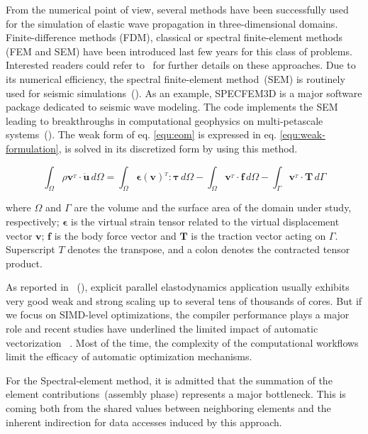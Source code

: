 \documentclass[a4paper,11pt]{article}
\begin{document}
From the numerical point of view, several methods have been successfully used
for the simulation of elastic wave propagation in three-dimensional domains.
Finite-difference methods (FDM), classical or spectral finite-element methods
(FEM and SEM) have been introduced last few years for this class of problems.
Interested readers could refer to~\cite{Moczo} for further details on these
approaches.  Due to its numerical efficiency, the spectral finite-element
method~(SEM) is routinely used for seismic simulations~(\cite{Kom97}). As an
example, SPECFEM3D is a major software package dedicated to seismic wave
modeling. The code implements the SEM  leading to breakthroughs in
computational geophysics on multi-petascale systems~(\cite{TsuboiAMPKT16}). The
weak form of eq. \ref{equ:eom}  is expressed in eq. \ref{equ:weak-formulation},
is solved in its discretized form by using this method.

\begin{equation}
\label{equ:weak-formulation}
\int _{\Omega} \rho \mathbf{v}^{_T} \cdot \mathbf{\ddot{u}} \, d\Omega =
  \int _{\Omega}  \boldsymbol{\epsilon}(\mathbf{v})^{_T} \colon
    \boldsymbol{\tau} \, d\Omega 
- \int _{\Omega}  \mathbf{v}^{_T} \cdot \mathbf{f} \, d\Omega
- \int _{\Gamma}  \mathbf{v}^{_T} \cdot \mathbf{T} \, d\Gamma
\end{equation}

where $\Omega$ and $\Gamma$ are the volume and the surface area of the domain
under study, respectively; $\boldsymbol{\epsilon}$ is the virtual strain tensor
related to the virtual displacement vector $\mathbf{v}$; $\mathbf{f}$ is the
body force vector and $\mathbf{T}$ is the traction vector acting on $\Gamma$.
Superscript $T$ denotes the transpose, and a colon denotes the contracted
tensor product.

As reported in ~(\cite{RotenCODWSWM16,TsuboiAMPKT16,BreuerHB16}), explicit
parallel elastodynamics application usually exhibits very good weak and strong
scaling up to several tens of thousands of cores. But if we focus on SIMD-level
optimizations, the compiler performance plays a major role and recent studies
have underlined the limited impact of automatic vectorization
~\cite{Sornet20171083,Kruzel20132030}.  Most of the time, the complexity of the
computational workflows limit the efficacy of automatic optimization
mechanisms. 

For the Spectral-element method, it is admitted that the summation of the
element contributions~(assembly phase) represents a major bottleneck. This is
coming both from the shared values between neighboring elements and the
inherent indirection for data accesses induced by this approach.
\end{document}
